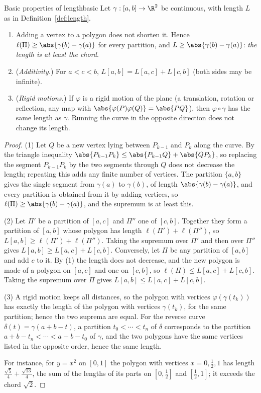 \documentclass[11pt]{article}
\begin{document}
\begin{thm}{Basic properties of length}{basic}
Let $\gamma:[a,b]\to\R^2$ be continuous, with length $L$ as in Definition~\ref{def:length}.
\begin{enumerate}[label=(\arabic*),nosep]
  \item Adding a vertex to a polygon does not shorten it. Hence $\ell(\Pi)\ge\abs{\gamma(b)-\gamma(a)}$ for every partition, and $L\ge\abs{\gamma(b)-\gamma(a)}$: \emph{the length is at least the chord}.
  \item (\emph{Additivity.}) For $a<c<b$, $L[a,b]=L[a,c]+L[c,b]$ (both sides may be infinite).
  \item (\emph{Rigid motions.}) If $\varphi$ is a rigid motion of the plane (a translation, rotation or reflection, any map with $\abs{\varphi(P)\varphi(Q)}=\abs{PQ}$), then $\varphi\circ\gamma$ has the same length as $\gamma$. Running the curve in the opposite direction does not change its length.
\end{enumerate}
\end{thm}
\begin{proof}
(1) Let $Q$ be a new vertex lying between $P_{k-1}$ and $P_k$ along the curve. By the triangle inequality $\abs{P_{k-1}P_k}\le\abs{P_{k-1}Q}+\abs{QP_k}$, so replacing the segment $P_{k-1}P_k$ by the two segments through $Q$ does not decrease the length; repeating this adds any finite number of vertices. The partition $\{a,b\}$ gives the single segment from $\gamma(a)$ to $\gamma(b)$, of length $\abs{\gamma(b)-\gamma(a)}$, and every partition is obtained from it by adding vertices, so $\ell(\Pi)\ge\abs{\gamma(b)-\gamma(a)}$, and the supremum is at least this.

(2) Let $\Pi'$ be a partition of $[a,c]$ and $\Pi''$ one of $[c,b]$. Together they form a partition of $[a,b]$ whose polygon has length $\ell(\Pi')+\ell(\Pi'')$, so $L[a,b]\ge\ell(\Pi')+\ell(\Pi'')$. Taking the supremum over $\Pi'$ and then over $\Pi''$ gives $L[a,b]\ge L[a,c]+L[c,b]$. Conversely, let $\Pi$ be any partition of $[a,b]$ and add $c$ to it. By (1) the length does not decrease, and the new polygon is made of a polygon on $[a,c]$ and one on $[c,b]$, so $\ell(\Pi)\le L[a,c]+L[c,b]$. Taking the supremum over $\Pi$ gives $L[a,b]\le L[a,c]+L[c,b]$.

(3) A rigid motion keeps all distances, so the polygon with vertices $\varphi(\gamma(t_k))$ has exactly the length of the polygon with vertices $\gamma(t_k)$, for the same partition; hence the two suprema are equal. For the reverse curve $\delta(t)=\gamma(a+b-t)$, a partition $t_0<\cdots<t_n$ of $\delta$ corresponds to the partition $a+b-t_n<\cdots<a+b-t_0$ of $\gamma$, and the two polygons have the same vertices listed in the opposite order, hence the same length.

For instance, for $y=x^2$ on $[0,1]$ the polygon with vertices $x=0,\frac12,1$ has length $\frac{\sqrt5}4+\frac{\sqrt{13}}4$, the sum of the lengths of its parts on $[0,\frac12]$ and $[\frac12,1]$; it exceeds the chord $\sqrt2$.
\end{proof}
\end{document}
